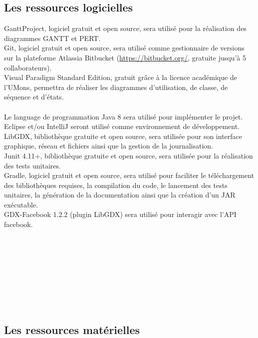 \documentclass[]{article}
\begin{document}
\subsection{Les ressources logicielles}
GanttProject, logiciel gratuit et open source, sera utilisé pour la réalisation des diagrammes GANTT et PERT.\\
Git, logiciel gratuit et open source, sera utilisé comme gestionnaire de versions sur la plateforme Atlassia Bitbucket (\url{https://bitbucket.org/}, gratuite jusqu'à 5 collaborateurs).\\
Visual Paradigm Standard Edition, gratuit grâce à la licence académique de l’UMons, permettra de réaliser les diagrammes d'utilisation, de classe, de séquence et d'états.\\
\\
Le language de programmation Java 8 sera utilisé pour implémenter le projet.\\
Eclipse et/ou IntelliJ seront utilisé comme environnement de développement.\\
LibGDX, bibliothèque gratuite et open source, sera utilisée pour son interface graphique, réseau et fichiers ainsi que la gestion de la journalisation.\\
Junit 4.11+, bibliothèque gratuite et open source, sera utilisée pour la réalisation des tests unitaires.\\
Gradle, logiciel gratuit et open source, sera utilisé pour faciliter le téléchargement des bibliothèques requises, la compilation du code, le lancement des tests unitaires, la génération de la documentation ainsi que la création d'un JAR exécutable.\\
GDX-Facebook 1.2.2 (plugin LibGDX) sera utilisé pour interagir avec l'API facebook.\\
\\
\\
\\
\\
\\
\\
\\
\\

\subsection{Les ressources matérielles}
\end{document}
